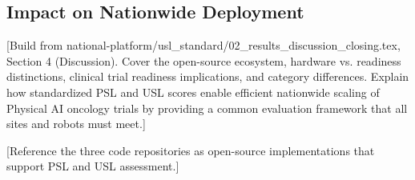 \subsection{Impact on Nationwide Deployment}
\label{subsec:standards-impact}

[Build from national-platform/usl\_standard/02\_results\_discussion\_closing.tex,
Section 4 (Discussion). Cover the open-source ecosystem, hardware vs.
readiness distinctions, clinical trial readiness implications, and category
differences. Explain how standardized PSL and USL scores enable efficient
nationwide scaling of Physical AI oncology trials by providing a common
evaluation framework that all sites and robots must meet.]

[Reference the three code repositories \cite{main-repo, mcp-repo, fl-repo}
as open-source implementations that support PSL and USL assessment.]
